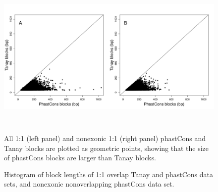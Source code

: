 \documentclass[12pt]{report}
\begin{document}
\begin{figure}[htbp]
\centering
\includegraphics[width=\textwidth, height=80mm]{scatterplot_1_1_all_non}
\caption[Caption for LOF]{All 1:1 (left panel) and nonexonic 1:1 (right panel) phastCons and Tanay blocks are plotted as geometric points, showing that the size of phastCons blocks are larger than Tanay blocks.}
\label{fig:1_1_scatterplot}
\end{figure}

\begin{figure}[htbp]
\centering
{}
\caption[Caption for LOF]{\centering Histogram of block lengths of 1:1 overlap Tanay and phastCons data sets, and nonexonic nonoverlapping phastCons data set.}
\label{fig:1_1_hists}
\end{figure}

\newpage
\end{document}
